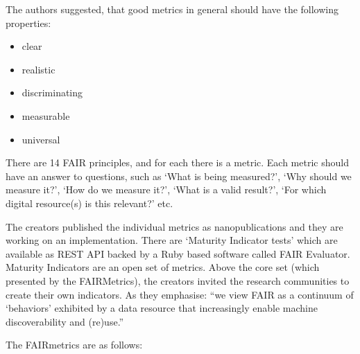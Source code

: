 The authors suggested, that good metrics in general should have the following properties:

\begin{itemize}
 \setlength{\parskip}{0pt}
 \setlength{\itemsep}{0pt plus 1pt}
 \item clear
 \item realistic
 \item discriminating
 \item measurable
 \item universal
\end{itemize}

There are 14 FAIR principles, and for each there is a metric. Each metric should have an answer to questions, such as `What is being measured?', `Why should we measure it?', `How do we measure it?', `What is a valid result?', `For which digital resource(s) is this relevant?' etc.

The creators published the individual metrics as nanopublications and they are working on an implementation. There are `Maturity Indicator tests' which are available as REST API backed by a Ruby based software called FAIR Evaluator. Maturity Indicators are an open set of metrics. Above the core set (which presented by the FAIRMetrics), the creators invited the research communities to create their own indicators. As they emphasise: ``we view FAIR as a continuum of `behaviors' exhibited by a data resource that increasingly enable machine discoverability and (re)use.''

The FAIRmetrics are as follows:

